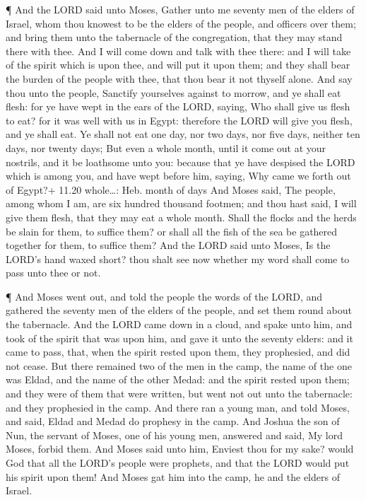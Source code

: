  ¶ And the LORD said unto Moses, Gather unto me seventy men
of the elders of Israel, whom thou knowest to be the elders of the
people, and officers over them; and bring them unto the tabernacle of
the congregation, that they may stand there with thee.  And
I will come down and talk with thee there: and I will take of the spirit
which is upon thee, and will put it upon them; and they shall bear the
burden of the people with thee, that thou bear it not thyself alone.
 And say thou unto the people, Sanctify yourselves against
to morrow, and ye shall eat flesh: for ye have wept in the ears of the
LORD, saying, Who shall give us flesh to eat? for it was well with us in
Egypt: therefore the LORD will give you flesh, and ye shall eat.
 Ye shall not eat one day, nor two days, nor five days,
neither ten days, nor twenty days;  But even a whole month,
until it come out at your nostrils, and it be loathsome unto you:
because that ye have despised the LORD which is among you, and have wept
before him, saying, Why came we forth out of Egypt?+ 11.20 whole\ldots:
Heb. month of days  And Moses said, The people, among whom
I am, are six hundred thousand footmen; and thou hast said, I will give
them flesh, that they may eat a whole month.  Shall the
flocks and the herds be slain for them, to suffice them? or shall all
the fish of the sea be gathered together for them, to suffice them?
 And the LORD said unto Moses, Is the LORD's hand waxed
short? thou shalt see now whether my word shall come to pass unto thee
or not.

 ¶ And Moses went out, and told the people the words of the
LORD, and gathered the seventy men of the elders of the people, and set
them round about the tabernacle.  And the LORD came down in
a cloud, and spake unto him, and took of the spirit that was upon him,
and gave it unto the seventy elders: and it came to pass, that, when the
spirit rested upon them, they prophesied, and did not cease.
 But there remained two of the men in the camp, the name of
the one was Eldad, and the name of the other Medad: and the spirit
rested upon them; and they were of them that were written, but went not
out unto the tabernacle: and they prophesied in the camp. 
And there ran a young man, and told Moses, and said, Eldad and Medad do
prophesy in the camp.  And Joshua the son of Nun, the
servant of Moses, one of his young men, answered and said, My lord
Moses, forbid them.  And Moses said unto him, Enviest thou
for my sake? would God that all the LORD's people were prophets, and
that the LORD would put his spirit upon them!  And Moses
gat him into the camp, he and the elders of Israel.

